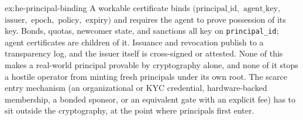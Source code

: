 \documentclass[11pt,a4paper]{article}
\theoremstyle{definition}
\theoremstyle{definition}
\theoremstyle{remark}
\begin{document}
\begin{pdsolution}{ex:he-principal-binding}
A workable certificate binds $(\text{principal\_id},$ $\text{agent\_key},$
$\text{issuer},$ $\text{epoch},$ $\text{policy},$ $\text{expiry})$ and requires the
agent to prove possession of its key. Bonds, quotas, newcomer state, and
sanctions all key on \texttt{principal\_id}; agent certificates are children of
it. Issuance and revocation publish to a transparency log, and the issuer itself
is cross-signed or attested. None of this makes a real-world principal provable
by cryptography alone, and none of it stops a hostile operator from minting
fresh principals under its own root. The scarce entry mechanism (an
organizational or KYC credential, hardware-backed membership, a bonded sponsor,
or an equivalent gate with an explicit fee) has to sit outside the cryptography, at
the point where principals first enter.
\end{pdsolution}

\end{document}
